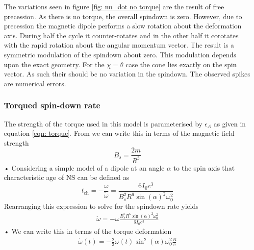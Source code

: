 \documentclass[../full_thesis/full_thesis.tex]{subfiles}
\begin{document}
The variations seen in figure \ref{fig: nu_dot no torque} are the result of
free precession. As there is no torque, the overall spindown is zero. However,
due to precession the magnetic dipole performs a slow rotation about the
deformation axis. During half the cycle it counter-rotates and in the other
half it corotates with the rapid rotation about the angular momentum vector.
The result is a symmetric modulation of the spindown about zero. This
modulation depends upon the exact geometry. For the $\chi=\theta$ case the cone
lies exactly on the spin vector. As such their should be no variation in the
spindown. The observed spikes are numerical errors.

\subsubsection{Torqued spin-down rate}
The strength of the torque used in this model is parameterised by $\epsilon_{A}$ as given
in equation \eqref{eqn: torque}. From \citet{Shapiro83} we can write this in terms of the
magnetic field strength 
\begin{equation}
B_{s} = \frac{2m}{R^{3}}
\end{equation}•
Considering a simple model of a dipole at an angle $\alpha$ to the spin axis that characteristic
age of NS can be defined as
\begin{equation}
t_{\textrm{ch}} = -\frac{\omega}{\dot{\omega}} = \frac{6 I_{0} c^{3}}{B_{s}^{2}R^{6} \sin(\alpha)^{2}\omega_{0}^{2}}
\end{equation}
Rearranging this expression to solve for the spindown rate yields
\begin{align}
\dot\omega = - \omega \frac{B_{s}^{2}R^{6} \sin(\alpha)^{2}\omega_{0}^{2}}{6I_{0}c^{3}}
\end{align}•
We can write this in terms of the torque deformation
\begin{align}
\dot\omega(t) = - \frac{2}{3}\omega(t) \sin^{2}(\alpha) \omega_{0}^{2} \frac{R}{c}
\label{eqn: EM spindown}
\end{align}
\end{document}
